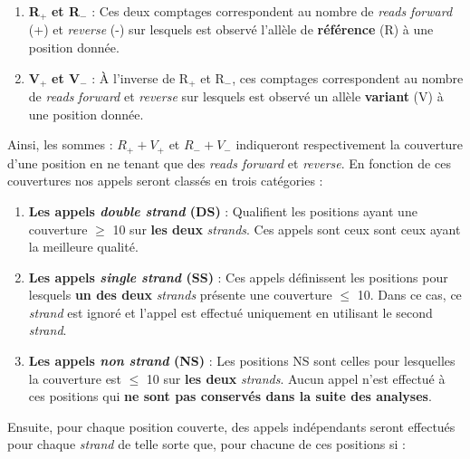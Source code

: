 \documentclass[12pt,twoside]{ugathesis}
\providecommand{\tightlist}{%
  \setlength{\itemsep}{0pt}\setlength{\parskip}{0pt}}
\begin{document}
\begin{enumerate}
\def\labelenumi{\arabic{enumi}.}
\tightlist
\item
  \textbf{R}\(_+\) \textbf{et R}\(_-\) : Ces deux comptages
  correspondent au nombre de \emph{reads} \emph{forward} (+) et
  \emph{reverse} (-) sur lesquels est observé l'allèle de
  \textbf{référence} (R) à une position donnée.\\
\item
  \textbf{V}\(_+\) \textbf{et V}\(_-\) : À l'inverse de R\(_+\) et
  R\(_-\), ces comptages correspondent au nombre de \emph{reads}
  \emph{forward} et \emph{reverse} sur lesquels est observé un allèle
  \textbf{variant} (V) à une position donnée.
\end{enumerate}

Ainsi, les sommes : \(R_+ + V_+\) et \(R_- + V_-\) indiqueront
respectivement la couverture d'une position en ne tenant que des
\emph{reads forward} et \emph{reverse}. En fonction de ces couvertures
nos appels seront classés en trois catégories :

\begin{enumerate}
\def\labelenumi{\arabic{enumi}.}
\item
  \textbf{Les appels \emph{double strand} (DS)} : Qualifient les
  positions ayant une couverture \(\ge\) 10 sur \textbf{les deux}
  \emph{strands}. Ces appels sont ceux sont ceux ayant la meilleure
  qualité.
\item
  \textbf{Les appels \emph{single strand} (SS)} : Ces appels définissent
  les positions pour lesquels \textbf{un des deux} \emph{strands}
  présente une couverture \(\le\) 10. Dans ce cas, ce \emph{strand} est
  ignoré et l'appel est effectué uniquement en utilisant le second
  \emph{strand}.
\item
  \textbf{Les appels \emph{non strand} (NS)} : Les positions NS sont
  celles pour lesquelles la couverture est \(\le\) 10 sur \textbf{les
  deux} \emph{strands}. Aucun appel n'est effectué à ces positions qui
  \textbf{ne sont pas conservés dans la suite des analyses}.
\end{enumerate}

Ensuite, pour chaque position couverte, des appels indépendants seront
effectués pour chaque \emph{strand} de telle sorte que, pour chacune de
ces positions si :
\end{document}
